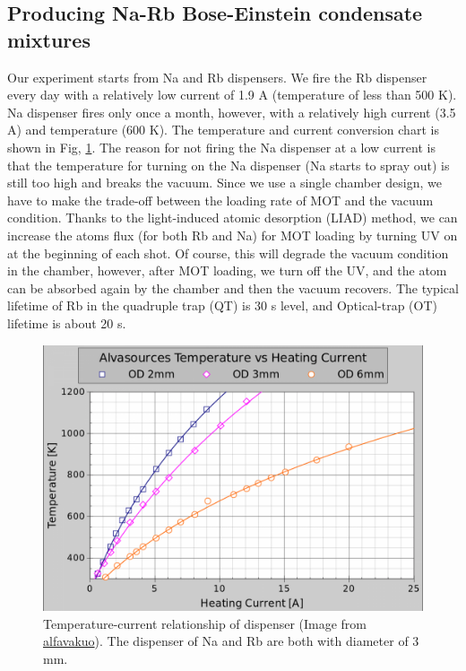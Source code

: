 \subsection{Producing Na-Rb Bose-Einstein condensate mixtures}

Our experiment starts from Na and Rb dispensers. We fire the Rb dispenser every day with a relatively low current of 1.9 A (temperature of less than 500 K). Na dispenser fires only once a month, however, with a relatively high current (3.5 A) and temperature (600 K). The temperature and current conversion chart is shown in Fig, \ref{Apparatus_dispen}. The reason for not firing the Na dispenser at a low current is that the temperature for turning on the Na dispenser (Na starts to spray out) is still too high and breaks the vacuum. Since we use a single chamber design, we have to make the trade-off between the loading rate of MOT and the vacuum condition. Thanks to the light-induced atomic desorption (LIAD) method, we can increase the atoms flux (for both Rb and Na) for MOT loading by turning UV on at the beginning of each shot. Of course, this will degrade the vacuum condition in the chamber, however, after MOT loading, we turn off the UV, and the atom can be absorbed again by the chamber and then the vacuum recovers. The typical lifetime of Rb in the quadruple trap (QT) is 30 s level, and Optical-trap (OT) lifetime is about 20 s. 

\begin{figure}[htb]
\begin{center}
\includegraphics[width = 0.7\linewidth]{figures/Apparatus_dispen.png}
\end{center}
\caption[Temperature-current relationship of dispenser (Image from \href{https://alfavakuo.eu/products/mvs/}{alfavakuo})]{Temperature-current relationship of dispenser (Image from \href{https://alfavakuo.eu/products/mvs/}{alfavakuo}). The dispenser of Na and Rb are both with diameter of 3 mm.}
\label{Apparatus_dispen}
\end{figure}


